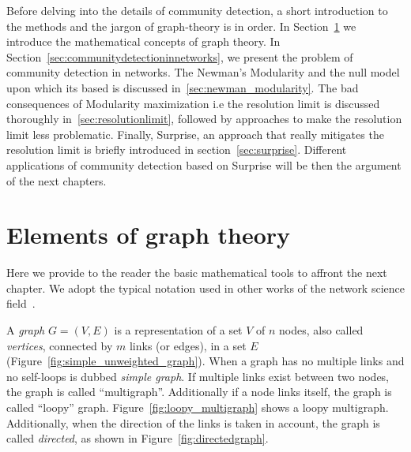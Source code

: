 Before delving into the details of community detection, a short introduction to the methods and the jargon of graph-theory is in order.
In Section~\ref{sec:elementsofgraphtheory} we introduce the mathematical concepts of graph theory. In Section~\ref{sec:communitydetectioninnetworks}, we present the problem of community detection in networks. The Newman's Modularity and the null model upon which its based is discussed in~\ref{sec:newman_modularity}. The bad consequences of Modularity maximization i.e the resolution limit is discussed thoroughly in~\ref{sec:resolutionlimit}, followed by approaches to make the resolution limit less problematic.
Finally, Surprise, an approach that really mitigates the resolution limit is briefly introduced in section~\ref{sec:surprise}. Different applications of community detection based on Surprise will be then the argument of the next chapters.

\section{Elements of graph theory}\label{sec:elementsofgraphtheory}
Here we provide to the reader the basic mathematical tools to affront the next chapter. We adopt the typical notation used in other works of the network science field~\cite{newman2010book,Estrada2011}.

A \emph{graph} $G=(V,E)$ is a representation of a set $V$ of $n$ nodes, also called \emph{vertices}, connected by $m$ links (or edges), in a set $E$ (Figure~\ref{fig:simple_unweighted_graph}). When a graph has no multiple links and no self-loops is dubbed \emph{simple graph}.
If multiple links exist between two nodes, the graph is called ``multigraph''. Additionally if a node links itself, the graph is called ``loopy'' graph. Figure~\ref{fig:loopy_multigraph} shows a loopy multigraph. Additionally, when the direction of the links is taken in account, the graph is called \emph{directed}, as shown in Figure~\ref{fig:directedgraph}.


